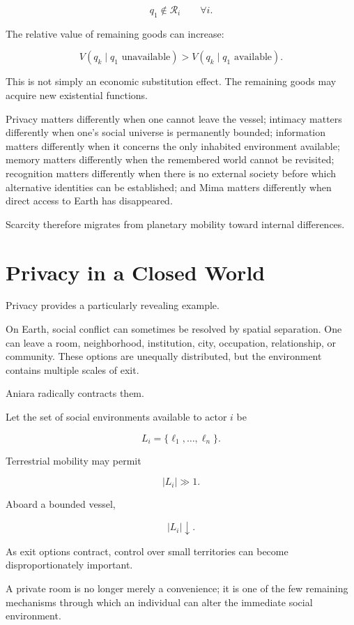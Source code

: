 \documentclass[11pt,oneside]{book}
\theoremstyle{definition}
\theoremstyle{remark}
\newcommand{\R}{\mathcal{R}}
\begin{document}
\[
q_1\notin\R_i
\qquad
\forall i.
\]

The relative value of remaining goods can increase:

\[
V(q_k\mid q_1\text{ unavailable})
>
V(q_k\mid q_1\text{ available}).
\]

This is not simply an economic substitution effect. The remaining goods may acquire new existential functions.

Privacy matters differently when one cannot leave the vessel; intimacy matters differently when one's social universe is permanently bounded; information matters differently when it concerns the only inhabited environment available; memory matters differently when the remembered world cannot be revisited; recognition matters differently when there is no external society before which alternative identities can be established; and Mima matters differently when direct access to Earth has disappeared.

Scarcity therefore migrates from planetary mobility toward internal differences.

\section{Privacy in a Closed World}

Privacy provides a particularly revealing example.

On Earth, social conflict can sometimes be resolved by spatial separation. One can leave a room, neighborhood, institution, city, occupation, relationship, or community. These options are unequally distributed, but the environment contains multiple scales of exit.

Aniara radically contracts them.

Let the set of social environments available to actor \(i\) be

\[
L_i
=
\{
\ell_1,\ldots,\ell_n
\}.
\]

Terrestrial mobility may permit

\[
|L_i|\gg1.
\]

Aboard a bounded vessel,

\[
|L_i|\downarrow.
\]

As exit options contract, control over small territories can become disproportionately important.

A private room is no longer merely a convenience; it is one of the few remaining mechanisms through which an individual can alter the immediate social environment.
\end{document}
